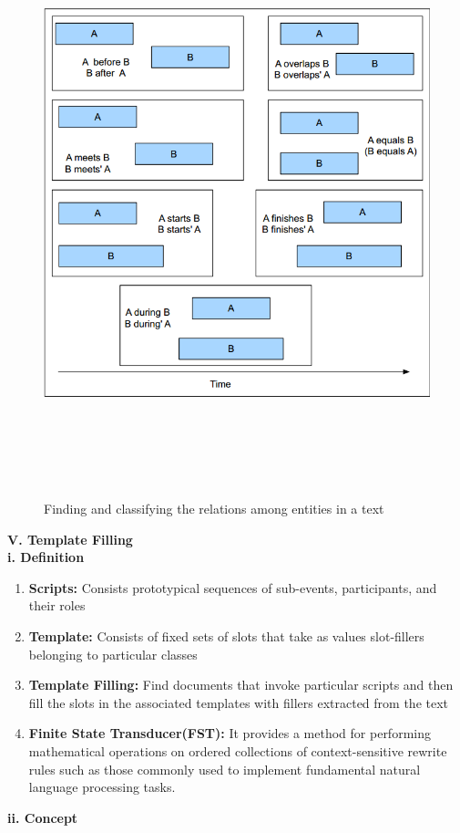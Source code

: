 \documentclass[a4paper,12pt]{report}
\begin{document}
\begin{figure}[h]
\centering	
\includegraphics[width=16cm, height=17cm]{"pic5"}
\caption{Finding and classifying the relations among entities in a text}
\end{figure}

\pagebreak
\noindent
\textbf{V. Template Filling}\\

\noindent
\textbf{i. Definition}
\begin{enumerate}
\item \textbf{Scripts: }Consists prototypical sequences of sub-events, participants, and their roles
\item \textbf{Template: }Consists of fixed sets of slots that take as values slot-fillers belonging to particular classes
\item \textbf{Template Filling: }Find documents that invoke particular scripts and then fill the slots in the associated templates with fillers extracted from the text
\item \textbf{Finite State Transducer(FST): }It provides a method for performing mathematical operations on ordered collections of context-sensitive rewrite rules such as those commonly used to implement fundamental natural language processing tasks.
\end{enumerate}
\noindent
\textbf{ii. Concept}
\end{document}
